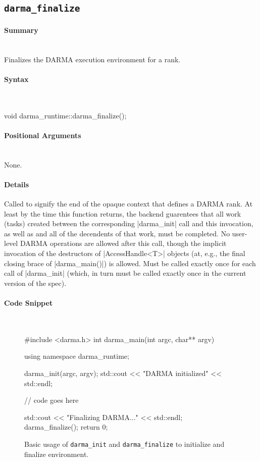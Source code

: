 
\subsection{\texttt{darma\_finalize}}
\label{ssec:api_fe_finalize}

\paragraph{Summary}\mbox{}\\
Finalizes the DARMA execution environment for a rank.

\paragraph{Syntax}\mbox{}\\ 
\begin{CppCode}
void darma_runtime::darma_finalize();
\end{CppCode}

\paragraph{Positional Arguments}\mbox{} \\
None. 

\paragraph{Details}\mbox{} 
Called to signify the end of the opaque context that defines a DARMA rank.  At
least by the time this function returns, the backend guarentees that all work
(tasks) created between the corresponding |darma\_init| call and this
invocation, as well as and all of the decendents of that work, must be
completed.  No user-level DARMA operations are allowed after this call, though
the implicit invocation of the destructors of |AccessHandle<T>| objects
(at, e.g., the final closing brace of |darma\_main()|) is allowed.  Must
be called exactly once for each call of |darma\_init| (which, in turn
must be called exactly once in the current version of the spec).

\paragraph{Code Snippet}\mbox{} \\
\begin{figure}[!h]
\begin{CppCodeNumb}
#include <darma.h>
int darma_main(int argc, char** argv)
{
  using namespace darma_runtime;

  darma_init(argc, argv);
  std::cout << "DARMA initialized" << std::endl;

  // code goes here

  std::cout << "Finalizing DARMA..." << std::endl;
  darma_finalize();
  return 0;
}
\end{CppCodeNumb}
\caption{Basic usage of \texttt{darma\_init} and \texttt{darma\_finalize} 
to initialize and finalize environment.}
\label{fig:fe_api_init}
\end{figure}

